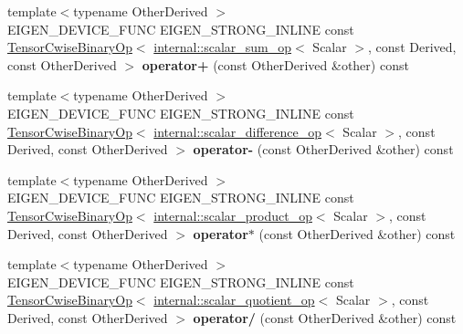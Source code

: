\begin{DoxyCompactItemize}
{\footnotesize template$<$typename Other\+Derived $>$ }\\E\+I\+G\+E\+N\+\_\+\+D\+E\+V\+I\+C\+E\+\_\+\+F\+U\+NC E\+I\+G\+E\+N\+\_\+\+S\+T\+R\+O\+N\+G\+\_\+\+I\+N\+L\+I\+NE const \hyperlink{class_eigen_1_1_tensor_cwise_binary_op}{Tensor\+Cwise\+Binary\+Op}$<$ \hyperlink{struct_eigen_1_1internal_1_1scalar__sum__op}{internal\+::scalar\+\_\+sum\+\_\+op}$<$ Scalar $>$, const Derived, const Other\+Derived $>$ {\bfseries operator+} (const Other\+Derived \&other) const
\item 
\mbox{\label{class_eigen_1_1_tensor_base_3_01_derived_00_01_read_only_accessors_01_4_aa64dc5516681748c97fdb7b7285f38dd}} 
{\footnotesize template$<$typename Other\+Derived $>$ }\\E\+I\+G\+E\+N\+\_\+\+D\+E\+V\+I\+C\+E\+\_\+\+F\+U\+NC E\+I\+G\+E\+N\+\_\+\+S\+T\+R\+O\+N\+G\+\_\+\+I\+N\+L\+I\+NE const \hyperlink{class_eigen_1_1_tensor_cwise_binary_op}{Tensor\+Cwise\+Binary\+Op}$<$ \hyperlink{struct_eigen_1_1internal_1_1scalar__difference__op}{internal\+::scalar\+\_\+difference\+\_\+op}$<$ Scalar $>$, const Derived, const Other\+Derived $>$ {\bfseries operator-\/} (const Other\+Derived \&other) const
\item 
\mbox{\label{class_eigen_1_1_tensor_base_3_01_derived_00_01_read_only_accessors_01_4_a7f7432a645e779677b86a89375abfaef}} 
{\footnotesize template$<$typename Other\+Derived $>$ }\\E\+I\+G\+E\+N\+\_\+\+D\+E\+V\+I\+C\+E\+\_\+\+F\+U\+NC E\+I\+G\+E\+N\+\_\+\+S\+T\+R\+O\+N\+G\+\_\+\+I\+N\+L\+I\+NE const \hyperlink{class_eigen_1_1_tensor_cwise_binary_op}{Tensor\+Cwise\+Binary\+Op}$<$ \hyperlink{struct_eigen_1_1internal_1_1scalar__product__op}{internal\+::scalar\+\_\+product\+\_\+op}$<$ Scalar $>$, const Derived, const Other\+Derived $>$ {\bfseries operator$\ast$} (const Other\+Derived \&other) const
\item 
\mbox{\label{class_eigen_1_1_tensor_base_3_01_derived_00_01_read_only_accessors_01_4_aa4774b257c4be6401f408c8b0372ebec}} 
{\footnotesize template$<$typename Other\+Derived $>$ }\\E\+I\+G\+E\+N\+\_\+\+D\+E\+V\+I\+C\+E\+\_\+\+F\+U\+NC E\+I\+G\+E\+N\+\_\+\+S\+T\+R\+O\+N\+G\+\_\+\+I\+N\+L\+I\+NE const \hyperlink{class_eigen_1_1_tensor_cwise_binary_op}{Tensor\+Cwise\+Binary\+Op}$<$ \hyperlink{struct_eigen_1_1internal_1_1scalar__quotient__op}{internal\+::scalar\+\_\+quotient\+\_\+op}$<$ Scalar $>$, const Derived, const Other\+Derived $>$ {\bfseries operator/} (const Other\+Derived \&other) const

\end{DoxyCompactItemize}
